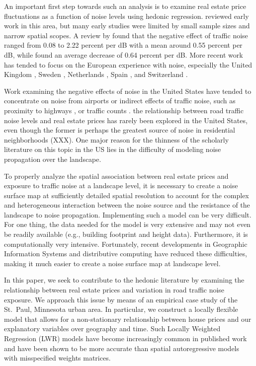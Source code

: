 \documentclass{article}\usepackage{graphicx, color}
\begin{document}
An important first step towards such an analysis is to examine real estate price fluctuations as a function of noise levels using hedonic regression. \citet{Nelson1982} reviewed early work in this area, but many early studies were limited by small sample sizes and narrow spatial scopes. A review by \citet{Bateman2001} found that the negative eﬀect of traﬃc noise ranged from 0.08 to 2.22 percent per dB with a mean around 0.55 percent per dB, while \citet{Navrud2002} found an average decrease of 0.64 percent per dB. More recent work has tended to focus on the European experience with noise, especially the United Kingdom \citep{Day2007, Blanco2011}, Sweden \citep{Wilhelmsson2000, Andersson2010}, Netherlands \citep{Theebe2004a}, Spain \citep{MarmolejoDuarteCarlos;GonzalezTamez2009}, and Switzerland \citep{Baranzini2010}. 

Work examining the negative effects of noise in the United States have tended to concentrate on noise from airports \citep{Espey2000, McMillen2004, Cohen2008a} or indirect effects of traffic noise, such as proximity to highways \citep{Matthews2007, Chernobai2009, Li2012}, or traffic counts \citep{Highes1992, Larsen2012}. the relationship between road traffic noise levels and real estate prices has rarely been explored in the United States, even though the former is perhaps the greatest source of noise in residential neighborhoods (XXX).  One major reason for the thinness of the scholarly literature on this topic in the US lies in the difficulty of modeling noise propagation over the landscape.  

To properly analyze the spatial association between real estate prices and exposure to traffic noise at a landscape level, it is necessary to create a noise surface map at sufficiently detailed spatial resolution to account for the complex and heterogeneous interaction between the noise source and the resistance of the landscape to noise propagation.  Implementing such a model can be very difficult.  For one thing, the data needed for the model is very extensive and may not even be readily available (e.g., building footprint and height data).  Furthermore, it is computationally very intensive. Fortunately, recent developments in Geographic Information Systems and distributive computing have reduced these difficulties, making it much easier to create a noise surface map at landscape level.  

In this paper, we seek to contribute to the hedonic literature by examining the relationship between real estate prices and variation in road traffic noise exposure.  We approach this issue by means of an empirical case study of the St.\ Paul, Minnesota urban area.  In particular, we construct a locally flexible model that allows for a non-stationary relationship between house prices and our explanatory variables over geography and time. Such Locally Weighted Regression (LWR) models have become increasingly common in published work and have been shown to be more accurate than spatial autoregressive models with misspecified weights matrices.
\end{document}
